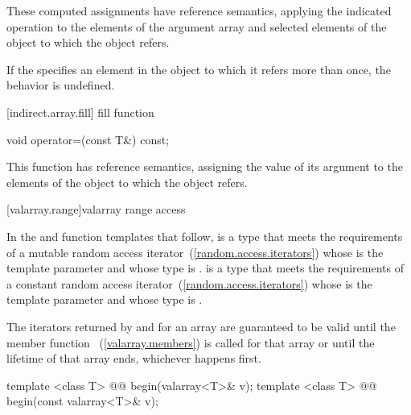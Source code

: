 \begin{itemdescr}
\pnum
These computed assignments have reference semantics, applying the indicated
operation to the elements of the argument array and selected elements of the
object to which the
object refers.

\pnum
If the
specifies an element in the
object to which it refers more than once,
the behavior is undefined.
\end{itemdescr}

[indirect.array.fill]{ fill function}

%
\begin{itemdecl}
void operator=(const T&) const;
\end{itemdecl}

\begin{itemdescr}
\pnum
This function has reference semantics, assigning the value of its argument
to the elements of the
object to which the
object refers.
\end{itemdescr}

[valarray.range]{valarray range access}

\pnum
In the  and  function templates that follow, 
is a type that meets the requirements of a mutable random access
iterator~(\ref{random.access.iterators}) whose  is the template
parameter  and whose  type is .  is a
type that meets the requirements of a constant random access
iterator~(\ref{random.access.iterators}) whose  is the template
parameter  and whose  type is .

\pnum
The iterators returned by  and  for an array
are guaranteed to be valid until the member function
~(\ref{valarray.members}) is called for that
array or until the lifetime of that array ends, whichever happens
first.

%
%
\begin{itemdecl}
template <class T> @@ begin(valarray<T>& v);
template <class T> @@ begin(const valarray<T>& v);
\end{itemdecl}

